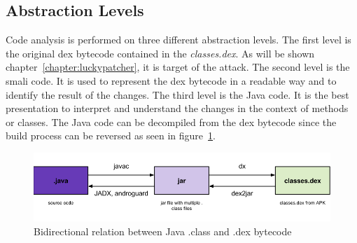\subsection{Abstraction Levels}
Code analysis is performed on three different abstraction levels.
\newline
The first level is the original dex bytecode contained in the \textit{classes.dex}.
As will be shown chapter~\ref{chapter:luckypatcher}, it is target of the attack.
\newline
The second level is the smali code.
It is used to represent the dex bytecode in a readable way and to identify the result of the changes.
\newline
The third level is the Java code.
It is the best presentation to interpret and understand the changes in the context of methods or classes.
\newline
The Java code can be decompiled from the dex bytecode since the build process can be reversed as seen in figure~\ref{fig:re1}.
\newline
\begin{figure}[h]
    \centering
    \includegraphics[width=1\textwidth]{data/re1.png}
    \caption{Bidirectional relation between Java .class and .dex bytecode \cite{andevconDalvikART}}
    \label{fig:re1}
\end{figure}
\newline

